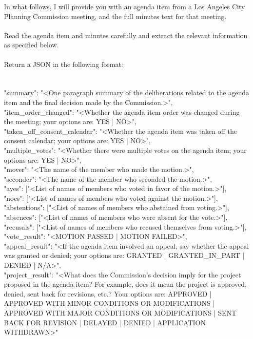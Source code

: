 In what follows, I will provide you with an agenda item from a Los Angeles City Planning Commission meeting, and the full minutes text for that meeting. \\ 
\\ 
Read the agenda item and minutes carefully and extract the relevant information as specified below.\\ 
\\ 
Return a JSON in the following format:\\ 
\\ 
{\\ 
    "summary": "<One paragraph summary of the deliberations related to the agenda item and the final decision made by the Commission.>",\\ 
    "item_order_changed": "<Whether the agenda item order was changed during the meeting; your options are: YES | NO>",\\ 
    "taken_off_consent_calendar": "<Whether the agenda item was taken off the consent calendar; your options are: YES | NO>",\\ 
    "multiple_votes": "<Whether there were multiple votes on the agenda item; your options are: YES | NO>",\\ 
    "mover": "<The name of the member who made the motion.>",\\ 
    "seconder": "<The name of the member who seconded the motion.>",\\ 
    "ayes": ["<List of names of members who voted in favor of the motion.>"],\\ 
    "noes": ["<List of names of members who voted against the motion.>"],\\ 
    "abstentions": ["<List of names of members who abstained from voting.>"],\\ 
    "absences": ["<List of names of members who were absent for the vote.>"],\\ 
    "recusals": ["<List of names of members who recused themselves from voting.>"],\\ 
    "vote_result": "<MOTION PASSED | MOTION FAILED>",\\ 
    "appeal_result": "<If the agenda item involved an appeal, say whether the appeal was granted or denied; your options are: GRANTED | GRANTED_IN_PART | DENIED | N/A>",\\ 
    "project_result": "<What does the Commission's decision imply for the project proposed in the agenda item? For example, does it mean the project is approved, denied, sent back for revisions, etc.? Your options are: APPROVED | APPROVED WITH MINOR CONDITIONS OR MODIFICATIONS | APPROVED WITH MAJOR CONDITIONS OR MODIFICATIONS | SENT BACK FOR REVISION | DELAYED | DENIED | APPLICATION WITHDRAWN>" \\ 
}\\ 
